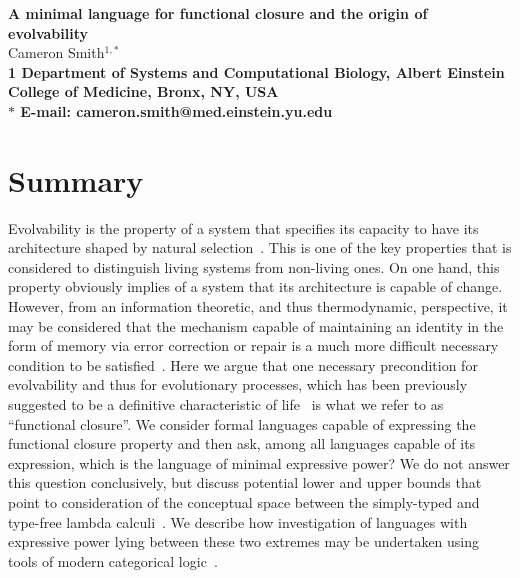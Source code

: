 \documentclass[10pt]{article}
\date{}
\theoremstyle{plain}
\theoremstyle{definition}
\theoremstyle{remark}
\begin{document}
\let\ref\autoref

\pagebreak
{}

\begin{flushleft}
{\Large
\textbf{A minimal language for functional closure and the origin of evolvability}
}
\\
Cameron Smith$^{1, \ast}$
\\
\bf{1} Department of Systems and Computational Biology, Albert Einstein College of Medicine, Bronx, NY, USA
\\
$\ast$ E-mail: cameron.smith@med.einstein.yu.edu
\end{flushleft}


\setcounter{secnumdepth}{4}

\section{Summary}
Evolvability is the property of a system that specifies its capacity to have its architecture shaped by natural selection~\cite{Wagner2008b}. This is one of the key properties that is considered to distinguish living systems from non-living ones. On one hand, this property obviously implies of a system that its architecture is capable of change. However, from an information theoretic, and thus thermodynamic, perspective, it may be considered that the mechanism capable of maintaining an identity in the form of memory via error correction or repair is a much more difficult necessary condition to be satisfied~\cite{Gacs2001}. Here we argue that one necessary precondition for evolvability and thus for evolutionary processes, which has been previously suggested to be a definitive characteristic of life~\cite{Rosen1972,Rosen1991,Zafiris2012,Mossio2009,Letelier2006} is what we refer to as ``functional closure''. We consider formal languages capable of expressing the functional closure property and then ask, among all languages capable of its expression, which is the language of minimal expressive power?  We do not answer this question conclusively, but discuss potential lower and upper bounds that point to consideration of the conceptual space between the simply-typed and type-free lambda calculi~\cite{Barendregt1985}. We describe how investigation of languages with expressive power lying between these two extremes may be undertaken using tools of modern categorical logic~\cite{Crole1994a,Awodey2006}.
\end{document}
